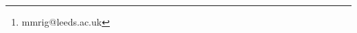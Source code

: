 \documentclass[a4paper,british]{scrartcl}
\author{René García\thanks{mmrig@leeds.ac.uk}\\
  \small{\texttt\leeds}
}
\begin{document}
\title{}
\maketitle

\begin{abstract}

\end{abstract}





\printbibliography
\end{document}
